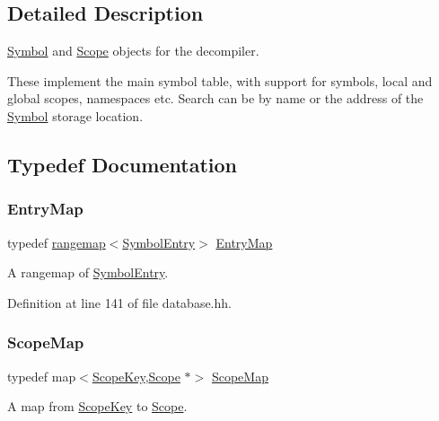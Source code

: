 \subsection{Detailed Description}
\mbox{\hyperlink{class_symbol}{Symbol}} and \mbox{\hyperlink{class_scope}{Scope}} objects for the decompiler. 

These implement the main symbol table, with support for symbols, local and global scopes, namespaces etc. Search can be by name or the address of the \mbox{\hyperlink{class_symbol}{Symbol}} storage location. 

\subsection{Typedef Documentation}
\mbox{\label{database_8hh_a44a8ea0c0009b316b2651d374e5d4260}} 
\subsubsection{\texorpdfstring{EntryMap}{EntryMap}}
{\footnotesize\ttfamily typedef \mbox{\hyperlink{classrangemap}{rangemap}}$<$\mbox{\hyperlink{class_symbol_entry}{Symbol\+Entry}}$>$ \mbox{\hyperlink{database_8hh_a44a8ea0c0009b316b2651d374e5d4260}{Entry\+Map}}}



A rangemap of \mbox{\hyperlink{class_symbol_entry}{Symbol\+Entry}}. 



Definition at line 141 of file database.\+hh.

\mbox{\label{database_8hh_a471f91376cdded8bf673b01d6e85f700}} 
\subsubsection{\texorpdfstring{ScopeMap}{ScopeMap}}
{\footnotesize\ttfamily typedef map$<$\mbox{\hyperlink{class_scope_key}{Scope\+Key}},\mbox{\hyperlink{class_scope}{Scope}} $\ast$$>$ \mbox{\hyperlink{database_8hh_a471f91376cdded8bf673b01d6e85f700}{Scope\+Map}}}



A map from \mbox{\hyperlink{class_scope_key}{Scope\+Key}} to \mbox{\hyperlink{class_scope}{Scope}}. 



